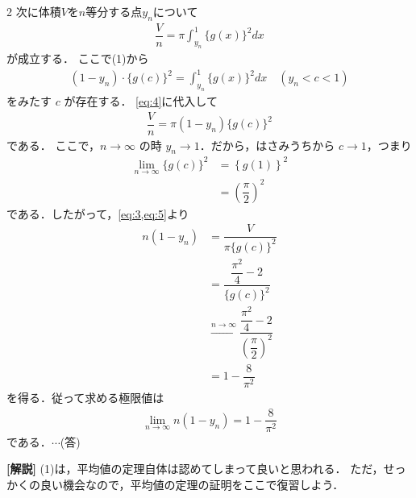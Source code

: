 \documentclass[../../main.tex]{subfiles}
\begin{document}
\begin{multicols}{2}
  次に体積$V$を$n$等分する点$y_n$について
  \begin{align}
    \dfrac{V}{n} = \pi \int_{y_n}^{1} \{g(x)\}^2 dx \label{eq:4}
  \end{align}
  が成立する．
  ここで(1)から
  \begin{align}
    (1-y_n) \cdot \{g(c)\}^2 = \int_{y_n}^{1} \{g(x)\}^2 dx \quad (y_n < c < 1)
  \end{align}
  をみたす $c$ が存在する．
  \cref{eq:4}に代入して
  \begin{align}
    \dfrac{V}{n} = \pi (1-y_n) \{g(c)\}^2 \label{eq:5}
  \end{align}
  である．
  ここで，$n \to \infty$ の時 $y_n \to 1$．だから，はさみうちから $c \to 1$，つまり
  \begin{align}
    \lim_{n\to\infty} \{g(c)\}^2
    & = \left\{g(1) \right\}^2       \\
    & = \left(\dfrac{\pi}{2}\right)^2
  \end{align}
  である．したがって，\cref{eq:3,eq:5}より
  \begin{align}
    n(1-y_n)
    & = \dfrac{V}{\pi\{g(c)\}^2}                                                         \\
    & = \dfrac{\dfrac{\pi^2}{4} - 2}{\{g(c)\}^2}                                          \\
    & \xrightarrow{n\to\infty} \dfrac{\dfrac{\pi^2}{4} - 2}{\left(\dfrac{\pi}{2}\right)^2} \\
    & = 1 -  \dfrac{8}{\pi^2}
  \end{align}
  を得る．従って求める極限値は
  \begin{align}
    \lim_{n\to\infty} n(1-y_n) = 1 -  \dfrac{8}{\pi^2}
  \end{align}
  である．$\cdots$(答)

  {\bf [解説]}
  (1)は，平均値の定理自体は認めてしまって良いと思われる．
  ただ，せっかくの良い機会なので，平均値の定理の証明をここで復習しよう．

  \newpage
\end{multicols}
\end{document}
